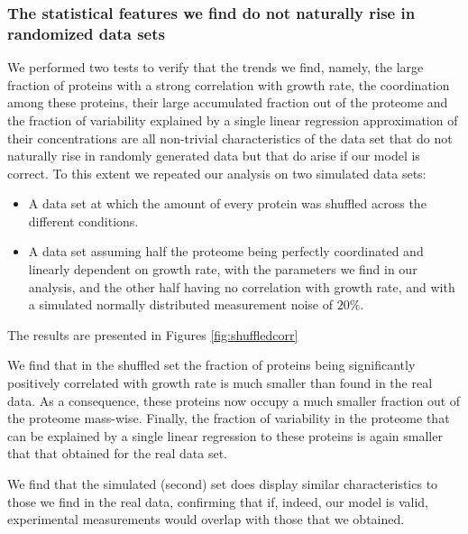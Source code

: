 \subsubsection{The statistical features we find do not naturally rise in randomized data sets}
We performed two tests to verify that the trends we find, namely, the large fraction of proteins with a strong correlation with growth rate, the coordination among these proteins, their large accumulated fraction out of the proteome and the fraction of variability explained by a single linear regression approximation of their concentrations are all non-trivial characteristics of the data set that do not naturally rise in randomly generated data but that do arise if our model is correct.
To this extent we repeated our analysis on two simulated data sets:
\begin{itemize}
\item A data set at which the amount of every protein was shuffled across the different conditions.
\item A data set assuming half the proteome being perfectly coordinated and linearly dependent on growth rate, with the parameters we find in our analysis, and the other half having no correlation with growth rate, and with a simulated normally distributed measurement noise of $20\%$.
\end{itemize}
The results are presented in Figures \ref{fig:shuffledcorr}

We find that in the shuffled set the fraction of proteins being significantly positively correlated with
growth rate is much smaller than found in the real data.
As a consequence, these proteins now occupy a much smaller fraction out of the proteome mass-wise.
Finally, the fraction of variability in the proteome that can be explained by a single linear regression to these proteins is again smaller that that obtained for the real data set.

We find that the simulated (second) set does display similar characteristics to those we find in the real data, confirming that if, indeed, our model is valid, experimental measurements would overlap with those that we obtained.